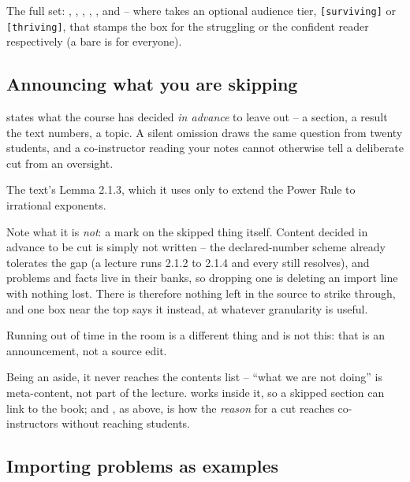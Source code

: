The full set: , , , ,
, and  -- where  takes an optional audience
tier, \texttt{[surviving]} or \texttt{[thriving]}, that stamps the box for the
struggling or the confident reader respectively (a bare  is for
everyone).

\subsection{Announcing what you are skipping}

 states what the course has decided \emph{in advance} to leave
out -- a section, a result the text numbers, a topic. A silent omission draws
the same question from twenty students, and a co-instructor reading your notes
cannot otherwise tell a deliberate cut from an oversight.

\begin{manexample}
\begin{notcovered}
  The text's Lemma 2.1.3, which it uses only to extend the
  Power Rule to irrational exponents.
\end{notcovered}
\end{manexample}

Note what it is \emph{not}: a mark on the skipped thing itself. Content decided
in advance to be cut is simply not written -- the declared-number scheme already
tolerates the gap (a lecture runs 2.1.2 to 2.1.4 and every  still
resolves), and problems and facts live in their banks, so dropping one is
deleting an import line with nothing lost. There is therefore nothing left in
the source to strike through, and one box near the top says it instead, at
whatever granularity is useful.

Running out of time in the room is a different thing and is not this: that is an
announcement, not a source edit.

Being an aside, it never reaches the contents list -- ``what we are not doing''
is meta-content, not part of the lecture.  works inside it, so a
skipped section can link to the book; and , as above, is
how the \emph{reason} for a cut reaches co-instructors without reaching
students.

\subsection{Importing problems as examples}

